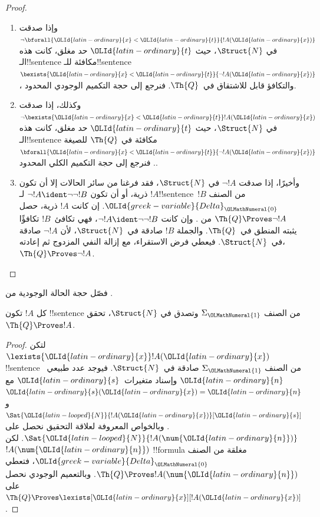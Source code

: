 \documentclass[../../../include/open-logic-section]{subfiles}
\begin{document}
\begin{proof}
\begin{enumerate}
$\bexists{{\OLId{latin-ordinary}{x}}<{\OLId{latin-ordinary}{t}}}{!A({\OLId{latin-ordinary}{x}})}$، فحجته نظير حجة التكميم الكلي المحدود.
%
\item وإذا صدقت $\lnot\bforall{{\OLId{latin-ordinary}{x}}<{\OLId{latin-ordinary}{t}}}{!A({\OLId{latin-ordinary}{x}})}$ في
$\Struct{N}$، حيث ${\OLId{latin-ordinary}{t}}$ حد مغلق، كانت هذه الـ!!{sentence}
مكافئة للـ!!{sentence} $\bexists{{\OLId{latin-ordinary}{x}}<{\OLId{latin-ordinary}{t}}}{\lnot !A({\OLId{latin-ordinary}{x}})}$،
والتكافؤ قابل للاشتقاق في~$\Th{Q}$.
فنرجع إلى حجة التكميم الوجودي المحدود.
%
\item وكذلك، إذا صدقت $\lnot\bexists{{\OLId{latin-ordinary}{x}}<{\OLId{latin-ordinary}{t}}}!A({\OLId{latin-ordinary}{x}})$ في
$\Struct{N}$، حيث ${\OLId{latin-ordinary}{t}}$ حد مغلق، كانت هذه الـ!!{sentence} مكافئة في
$\Th{Q}$ للصيغة $\bforall{{\OLId{latin-ordinary}{x}}<{\OLId{latin-ordinary}{t}}}{\lnot !A({\OLId{latin-ordinary}{x}})}$.
فنرجع إلى حجة التكميم الكلي المحدود.
%
\item وأخيرًا، إذا صدقت $\lnot !A$ في $\Struct{N}$،
فقد فرغنا من سائر الحالات إلا أن تكون $!A$ ذرية، أو أن تكون
$\lnot !A\ident\lnot\lnot !B$ لـ!!{sentence}~$!B$
من الصنف ${\OLId{greek-variable}{Delta}}_{\OLMathNumeral{0}}$.
إن كانت $!A$ ذرية، حصل $\Th{Q}\Proves\lnot !A$
من .
وإن كانت $\lnot !A\ident\lnot\lnot !B$،
فهي تكافئ~$!B$ تكافؤًا يثبته المنطق في~$\Th{Q}$.
والجملة $!B$ صادقة في~$\Struct{N}$، لأن
$\lnot !A$ صادقة في~$\Struct{N}$.
فيعطي فرض الاستقراء، مع إزالة النفي المزدوج ثم إعادته،
$\Th{Q}\Proves\lnot !A$.
\end{enumerate}
\end{proof}

\begin{prob}
فصّل حجة الحالة الوجودية من
.
\end{prob}

\begin{thm}
كل $!A$ تكون !!{sentence} من الصنف $\Sigma_{\OLMathNumeral{1}}$ وتصدق في
$\Struct{N}$، تحقق $\Th{Q}\Proves !A$.
\end{thm}

\begin{proof}
لتكن $\lexists{{\OLId{latin-ordinary}{x}}}!A({\OLId{latin-ordinary}{x}})$ !!{sentence} من الصنف $\Sigma_{\OLMathNumeral{1}}$
صادقة في~$\Struct{N}$. فيوجد عدد طبيعي~${\OLId{latin-ordinary}{n}}$ وإسناد متغيرات~${\OLId{latin-ordinary}{s}}$
مع ${\OLId{latin-ordinary}{s}}({\OLId{latin-ordinary}{x}})={\OLId{latin-ordinary}{n}}$ و$\Sat{{\OLId{latin-looped}{N}}}{!A({\OLId{latin-ordinary}{x}})}[{\OLId{latin-ordinary}{s}}]$.
وبالخواص المعروفة لعلاقة التحقيق نحصل على
$\Sat{{\OLId{latin-looped}{N}}}{!A(\num {\OLId{latin-ordinary}{n}})}$.
لكن $!A(\num {\OLId{latin-ordinary}{n}})$ !!{formula} مغلقة من الصنف ${\OLId{greek-variable}{Delta}}_{\OLMathNumeral{0}}$،
فتعطي 
$\Th{Q}\Proves !A(\num {\OLId{latin-ordinary}{n}})$.
وبالتعميم الوجودي نحصل على
$\Th{Q}\Proves\lexists[{\OLId{latin-ordinary}{x}}][!A({\OLId{latin-ordinary}{x}})]$.
\end{proof}
\end{document}
